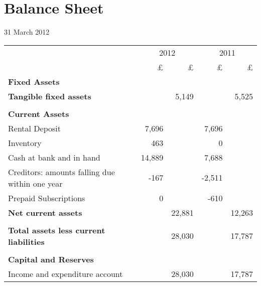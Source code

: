 \section{Balance Sheet}
31 March 2012

\begin{center}
\begin{tabular}{  l  r  r r r}
\toprule
                            & \multicolumn{2}{c}{2012} &  \multicolumn{2}{c}{2011} \\
\cmidrule(r){2-3} \cmidrule(r){4-5}
                                               & £        & £       & £      & £      \\
{\bf Fixed Assets}                             &          &         &        &        \\
{\bf Tangible fixed assets}                    &          & 5,149   &        & 5,525  \\
\cmidrule(r){2-3} \cmidrule(r){4-5} \\
{\bf Current Assets}                           &          &         &        &        \\
Rental Deposit                                 & 7,696    &         & 7,696  &        \\
Inventory                                      & 463      &         & 0      &        \\
Cash at bank and in hand                       & 14,889   &         & 7,688  &        \\
Creditors: amounts falling due within one year & -167     &         & -2,511 &       \\
Prepaid Subscriptions                          & 0        &         & -610   &       \\
{\bf Net current assets}                       &          & 22,881  &        & 12,263 \\
\cmidrule(r){2-3} \cmidrule(r){4-5} \\
{\bf Total assets less current liabilities}    &          & 28,030  &        & 17,787 \\
\cmidrule(r){2-3} \cmidrule(r){4-5}  \\
{\bf Capital and Reserves}&\\
Income and expenditure account                 &          & 28,030  &        & 17,787 \\
\bottomrule
\end{tabular}

\end{center}

